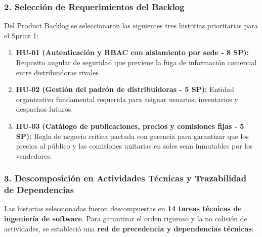 \subsubsection*{\color{mauve}2. Selección de Requerimientos del Backlog}
\noindent Del Product Backlog se seleccionaron las siguientes tres historias prioritarias para el Sprint 1:
\begin{enumerate}
    \item \textbf{HU-01 (Autenticación y RBAC con aislamiento por sede - 8 SP):} Requisito angular de seguridad que previene la fuga de información comercial entre distribuidoras rivales.
    \item \textbf{HU-02 (Gestión del padrón de distribuidoras - 5 SP):} Entidad organizativa fundamental requerida para asignar usuarios, inventarios y despachos futuros.
    \item \textbf{HU-03 (Catálogo de publicaciones, precios y comisiones fijas - 5 SP):} Regla de negocio crítica pactada con gerencia para garantizar que los precios al público y las comisiones unitarias en soles sean inmutables por los vendedores.
\end{enumerate}

\subsubsection*{\color{mauve}3. Descomposición en Actividades Técnicas y Trazabilidad de Dependencias}
\noindent Las historias seleccionadas fueron descompuestas en \textbf{14 tareas técnicas de ingeniería de software}. Para garantizar el orden riguroso y la no colisión de actividades, se estableció una \textbf{red de precedencia y dependencias técnicas}:

